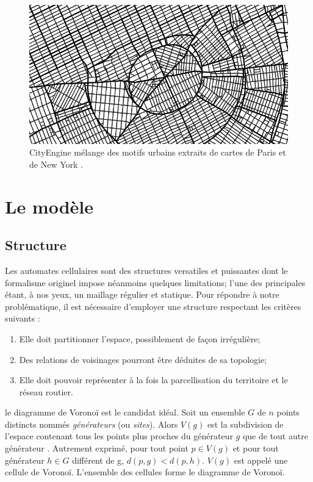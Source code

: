 \documentclass[12pt]{article}
\begin{document}
\begin{figure}[H]
  \centering
  \includegraphics[width=.8\linewidth]{images/cityengine.png}
  \caption{CityEngine mélange des motifs urbains extraits de cartes de
    Paris et de New York \cite{Parish2001}.}
  \label{fig:cityengine}
\end{figure}

\section{Le modèle}

\subsection{Structure}

Les automates cellulaires sont des structures versatiles et puissantes
dont le formalisme originel impose néanmoins quelques limitations;
l'une des principales étant, à nos yeux, un maillage régulier et
statique. Pour répondre à notre problématique, il est nécessaire
d'employer une structure respectant les critères suivants :

\begin{enumerate}
\item{Elle doit partitionner l'espace, possiblement de façon
  irrégulière;}
\item{Des relations de voisinages pourront être déduites de sa
  topologie;}
\item{Elle doit pouvoir représenter à la fois la parcellisation du
  territoire et le réseau routier.}
\end{enumerate}

le diagramme de Voronoï est le candidat idéal. Soit un ensemble $G$ de
$n$ points distincts nommés \textit{générateurs} (ou
\textit{sites}). Alors $V(g)$ est la subdivision de l'espace contenant
tous les points plus proches du générateur $g$ que de tout autre
générateur \cite{Edwards1993}. Autrement exprimé, pour tout point $p
\in V(g)$ et pour tout générateur $h \in G$ différent de g, $d(p,g) <
d(p,h)$. $V(g)$ est appelé une cellule de Voronoï. L'ensemble des
cellules forme le diagramme de Voronoï.
\end{document}
